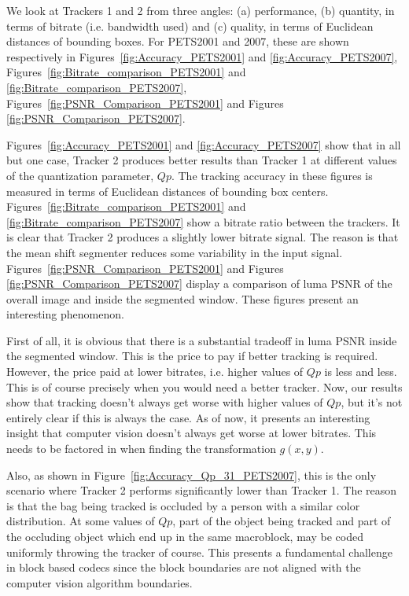 \documentclass{article}
\begin{document}
We look at Trackers 1 and 2 from three angles: (a) performance, (b) quantity, in terms of bitrate (i.e. bandwidth used) and (c) quality, in terms of Euclidean distances of bounding boxes.  For PETS2001 and 2007, these are shown respectively in Figures~\ref{fig:Accuracy_PETS2001} and \ref{fig:Accuracy_PETS2007}, Figures~\ref{fig:Bitrate_comparison_PETS2001} and \ref{fig:Bitrate_comparison_PETS2007}, Figures~\ref{fig:PSNR_Comparison_PETS2001} and Figures \ref{fig:PSNR_Comparison_PETS2007}.  

Figures~\ref{fig:Accuracy_PETS2001} and \ref{fig:Accuracy_PETS2007} show that in all but one case, Tracker 2 produces better results than Tracker 1 at different values of the quantization parameter, $Qp$.  The tracking accuracy in these figures is measured in terms of Euclidean distances of bounding box centers.  Figures~\ref{fig:Bitrate_comparison_PETS2001} and \ref{fig:Bitrate_comparison_PETS2007} show a bitrate ratio between the trackers.  It is clear that Tracker 2 produces a slightly lower bitrate signal.  The reason is that the mean shift segmenter reduces some variability in the input signal.  Figures~\ref{fig:PSNR_Comparison_PETS2001} and Figures \ref{fig:PSNR_Comparison_PETS2007} display a comparison of luma PSNR of the overall image and inside the segmented window.  These figures present an interesting phenomenon.

First of all, it is obvious that there is a substantial tradeoff in luma PSNR inside the segmented window.  This is the price to pay if better tracking is required.  However, the price paid at lower bitrates, i.e. higher values of $Qp$ is less and less.  This is of course precisely when you would need a better tracker.  Now, our results show that tracking doesn't always get worse with higher values of $Qp$, but it's not entirely clear if this is always the case.  As of now, it presents an interesting insight that computer vision doesn't always get worse at lower bitrates.  This needs to be factored in when finding the transformation $g(x,y)$.

Also, as shown in Figure~\ref{fig:Accuracy_Qp_31_PETS2007}, this is the only scenario where Tracker 2 performs significantly lower than Tracker 1.  The reason is that the bag being tracked is occluded by a person with a similar color distribution.  At some values of $Qp$, part of the object being tracked and part of the occluding object which end up in the same macroblock, may be coded uniformly throwing the tracker of course.  This presents a fundamental challenge in block based codecs since the block boundaries are not aligned with the computer vision algorithm boundaries.
\end{document}
